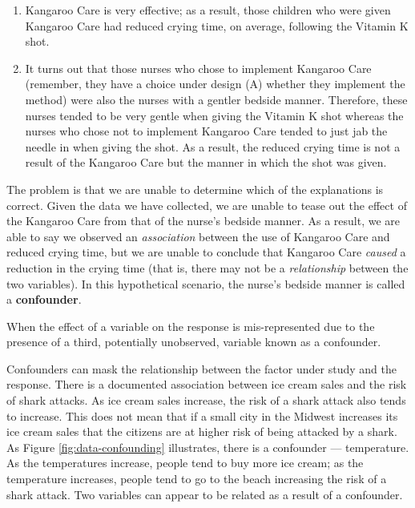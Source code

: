 \documentclass[]{book}
\providecommand{\tightlist}{%
  \setlength{\itemsep}{0pt}\setlength{\parskip}{0pt}}
\theoremstyle{plain}
\theoremstyle{mydefn}
\theoremstyle{myexmpl}
\theoremstyle{remark}
\let\BeginKnitrBlock\begin \let\EndKnitrBlock\end
\let\BeginKnitrBlock\begin \let\EndKnitrBlock\end
\begin{document}
\begin{enumerate}
\def\labelenumi{(\arabic{enumi})}
\tightlist
\item
  Kangaroo Care is very effective; as a result, those children who were
  given Kangaroo Care had reduced crying time, on average, following the
  Vitamin K shot.
\item
  It turns out that those nurses who chose to implement Kangaroo Care
  (remember, they have a choice under design (A) whether they implement
  the method) were also the nurses with a gentler bedside manner.
  Therefore, these nurses tended to be very gentle when giving the
  Vitamin K shot whereas the nurses who chose not to implement Kangaroo
  Care tended to just jab the needle in when giving the shot. As a
  result, the reduced crying time is not a result of the Kangaroo Care
  but the manner in which the shot was given.
\end{enumerate}

The problem is that we are unable to determine which of the explanations
is correct. Given the data we have collected, we are unable to tease out
the effect of the Kangaroo Care from that of the nurse's bedside manner.
As a result, we are able to say we observed an \emph{association}
between the use of Kangaroo Care and reduced crying time, but we are
unable to conclude that Kangaroo Care \emph{caused} a reduction in the
crying time (that is, there may not be a \emph{relationship} between the
two variables). In this hypothetical scenario, the nurse's bedside
manner is called a \textbf{confounder}.

\BeginKnitrBlock{definition}[Confounding]
\protect\hypertarget{def:defn-confounding}{}{\label{def:defn-confounding}
{} }When the effect of a variable on the
response is mis-represented due to the presence of a third, potentially
unobserved, variable known as a confounder.
\EndKnitrBlock{definition}

Confounders can mask the relationship between the factor under study and
the response. There is a documented association between ice cream sales
and the risk of shark attacks. As ice cream sales increase, the risk of
a shark attack also tends to increase. This does not mean that if a
small city in the Midwest increases its ice cream sales that the
citizens are at higher risk of being attacked by a shark. As Figure
\ref{fig:data-confounding} illustrates, there is a confounder ---
temperature. As the temperatures increase, people tend to buy more ice
cream; as the temperature increases, people tend to go to the beach
increasing the risk of a shark attack. Two variables can appear to be
related as a result of a confounder.
\end{document}
